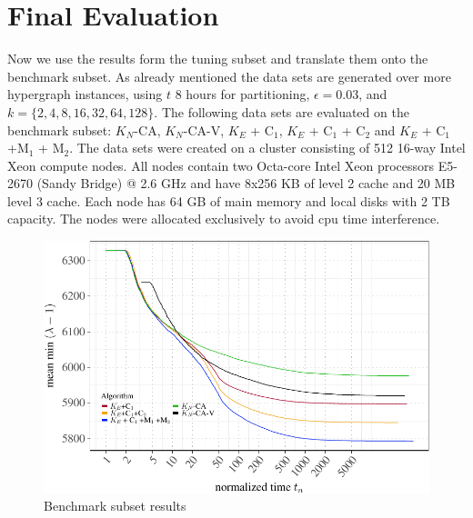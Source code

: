 \documentclass[a4paper,12pt,titlepage, BCOR7mm,headsepline]{scrbook}
\numberwithin{equation}{section}
\begin{document}
\section{Final Evaluation}
Now we use the results form the tuning subset and translate them onto the benchmark subset. As already mentioned the data sets are generated over more hypergraph instances, using $t$ 8 hours for partitioning, $\epsilon = 0.03$, and $k = \{2,4,8,16,32,64,128\}$. The following data sets are evaluated on the benchmark subset: $K_N$-CA, $K_N$-CA-V, $K_E$ + C$_1$, $K_E$ + C$_1$ + C$_2$ and $K_E$ + C$_1$ +M$_1$ + M$_2$. The data sets were created on a cluster consisting of 512 16-way Intel Xeon compute nodes. All nodes contain two Octa-core Intel Xeon processors E5-2670 (Sandy Bridge) @ 2.6 GHz and have 8x256 KB of level 2 cache and 20 MB level 3 cache. Each node has 64 GB of main memory and local disks with 2 TB capacity. The nodes were allocated exclusively to avoid cpu time interference.
\begin{figure}[H]
\caption{Benchmark subset results}
\begin{center}
\includegraphics[width=\textwidth]{rnw/tuning_subset_plots/full_plot-1}

\end{center}

\end{figure}
\end{document}

